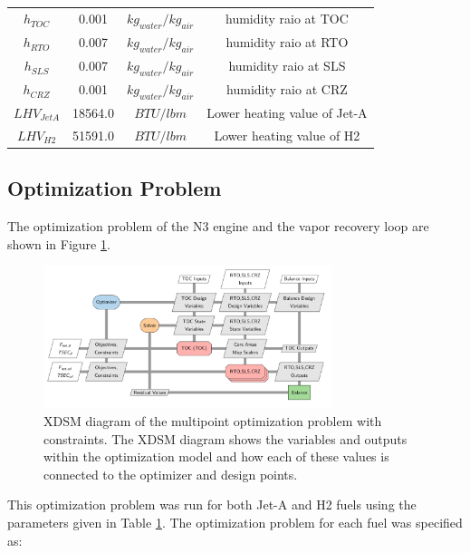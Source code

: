 \documentclass[conf]{new-aiaa}
\begin{document}
\begin{table}[H]
\begin{tabular}{|c|c|c|c|}
        $h_{TOC}$             & 0.001    & $kg_{water}/kg_{air}$ & humidity raio at TOC                           \\
        $h_{RTO}$             & 0.007    & $kg_{water}/kg_{air}$ & humidity raio at RTO                           \\
        $h_{SLS}$             & 0.007    & $kg_{water}/kg_{air}$ & humidity raio at SLS                           \\
        $h_{CRZ}$             & 0.001    & $kg_{water}/kg_{air}$ & humidity raio at CRZ                           \\
        $LHV_{JetA}$          & 18564.0  & $BTU/lbm$             & Lower heating value of Jet-A \cite{boeingJetA} \\
        $LHV_{H2}$            & 51591.0  & $BTU/lbm$             & Lower heating value of H2 \cite{engtoolboxH2}  \\
        \hline
    \end{tabular}
    \label{engine_params}
\end{table}

\subsection{Optimization Problem}
The optimization problem of the N3 engine and the vapor recovery loop are shown in Figure \ref{fig:N3_xdsm_opt}.

\begin{figure}[!hbt]
    \centering
    \includegraphics[width=0.75\textwidth]{N3_xdsm_opt.pdf}
    \caption{
        XDSM diagram of the multipoint optimization problem with constraints.
        The XDSM diagram shows the variables and outputs within the optimization model and how each of these values is connected to the optimizer and design points.}
    \label{fig:N3_xdsm_opt}
\end{figure}

\noindent
This optimization problem was run for both Jet-A and H2 fuels using the parameters given in Table \ref{engine_params}.
The optimization problem for each fuel was specified as:
\end{document}
